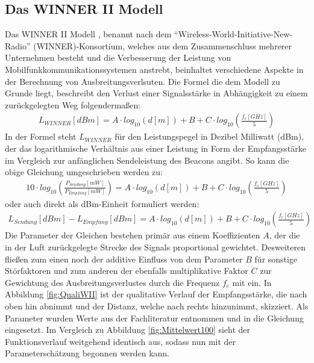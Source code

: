 \subsection{Das WINNER II Modell}
Das WINNER II Modell \cite{WII}, benannt nach dem "`Wireless-World-Initiative-New-Radio"' (WINNER)-Konsortium, welches aus dem Zusammenschluss mehrerer Unternehmen besteht und die Verbesserung der Leistung von Mobilfunkkommunikationssystemen anstrebt, beinhaltet verschiedene Aspekte in der Berechnung von Ausbreitungsverlsuten. Die Formel die dem Modell zu Grunde liegt, beschreibt den Verlust einer Signalsstärke in Abhängigkeit zu einem zurückgelegten Weg folgendermaßen:
\begin{align*}
L_{WINNER}\left [ dBm \right ]=A\cdot log_{10}\left (d\left [ m \right ]\right ) + B + C\cdot log_{10}\left (\frac{f_c\left [ GHz \right ]}{5}\right )
\end{align*}
In der Formel steht $L_{WINNER}$ für den Leistungspegel in Dezibel Milliwatt (dBm), der das logarithmische Verhältnis aus einer Leistung in Form der Empfangsstärke im Vergleich zur anfänglichen Sendeleistung des Beacons angibt. So kann die obige Gleichung umgeschrieben werden zu:
\begin{align*}
10\cdot log_{10}\left (\frac{P_{Sendung}\left [ mW \right ]}{P_{Empfang}\left [ mW \right ]}\right )=A\cdot log_{10}\left (d\left [ m \right ]\right ) + B + C\cdot log_{10}\left (\frac{f_c\left [ GHz \right ]}{5}\right )
\end{align*}
oder auch direkt als dBm-Einheit formuliert werden:
\begin{align}
L_{Sendung}\left [ dBm \right ] - L_{Empfang}\left [ dBm \right ]=A\cdot log_{10}\left (d\left [ m \right ]\right ) + B + C\cdot log_{10}\left (\frac{f_c\left [ GHz \right ]}{5}\right ) \label{eq:WII}
\end{align}
Die Parameter der Gleichen bestehen primär aus einem Koeffizienten $A$, der die in der Luft zurückgelegte Strecke des Signals proportional gewichtet. Desweiteren fließen zum einen noch der additive Einfluss von dem Parameter $B$ für sonstige Störfaktoren und zum anderen der ebenfalls multiplikative Faktor $C$ zur Gewichtung des Ausbreitungsverlustes durch die Frequenz $f_c$ mit ein. In Abbildung \ref{fig:QualiWII} ist der qualitative Verlauf der Empfangsstärke, die nach oben hin abnimmt und der Distanz, welche nach rechts hinzunimmt, skizziert. Als Parameter wurden Werte aus der Fachliteratur \cite{Kanal} entnommen und in die Gleichung eingesetzt. Im Vergleich zu Abbildung \ref{fig:Mittelwert100} sieht der Funktionsverlauf weitgehend identisch aus, sodass nun mit der Parameterschätzung begonnen werden kann.  
